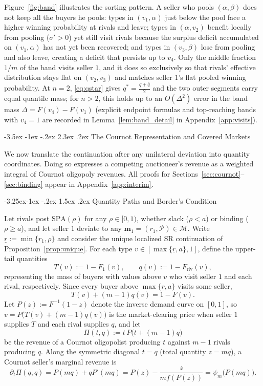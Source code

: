 \documentclass[12pt]{article}
\makeatletter
\theoremstyle{mystyle}
\theoremstyle{mystyle2}
\newcommand{\mmpfont}{\scshape}
\renewcommand\section{\@startsection {section}{1}{\z@}%
                                   {-3.5ex \@plus -1ex \@minus -.2ex}%
                                   {2.3ex \@plus .2ex}%
                                   {\normalfont\large\mmpfont}}
\renewcommand\subsection{\@startsection{subsection}{2}{\z@}%
                                     {-3.25ex\@plus -1ex \@minus -.2ex}%
                                     {1.5ex \@plus .2ex}%
                                     {\normalfont\normalsize\mmpfont}}
\newcommand{\M}{\mathcal{M}}
\newcommand{\cP}{\mathcal{P}}
\newcommand{\bmm}{\mathbf{m}}
\newcommand{\SPA}{\mathrm{SPA}}
\newcommand{\1}{\mathbf{1}}
\makeatother
\begin{document}
Figure~\ref{fig:band} illustrates the sorting pattern. A seller who pools $(\alpha,\beta)$ does not keep all the buyers he pools: types in $(v_1,\alpha)$ just below the pool face a higher winning probability at rivals and leave; types in $(\alpha,v_2)$ benefit locally from pooling ($\sigma'>0$) yet still visit rivals because the surplus deficit accumulated on $(v_1,\alpha)$ has not yet been recovered; and types in $(v_3,\beta)$ lose from pooling and also leave, creating a deficit that persists up to $v_4$. Only the middle fraction $1/m$ of the band visits seller $1$, and it does so exclusively so that rivals' effective distribution stays flat on $(v_2,v_3)$ and matches seller $1$'s flat pooled winning probability. At $n=2$, \eqref{eq:qstar} gives $q^*=\frac{\underline q+\bar q}{2}$ and the two outer segments carry equal quantile mass; for $n>2$, this holds up to an $O(\Delta^2)$ error in the band mass $\Delta=F(v_4)-F(v_1)$ (explicit endpoint formulas and top-reaching bands with $v_4=1$ are recorded in Lemma~\ref{lem:band_detail} in Appendix~\ref{app:visits}).

\section{The Cournot Representation and Covered Markets} \label{sec:cournot}

We now translate the continuation after any unilateral deviation into quantity coordinates. Doing so expresses a competing auctioneer's revenue as a weighted integral of Cournot oligopoly revenues. All proofs for Sections~\ref{sec:cournot}--\ref{sec:binding} appear in Appendix~\ref{app:interim}.

\subsection{Quantity Paths and Border's Condition}

Let rivals post $\SPA(\rho)$ for any $\rho\in[0,1)$, whether slack ($\rho<a$) or binding ($\rho\ge a$), and let seller $1$ deviate to any $\bmm_1=(r_1,\cP)\in\M$. Write $\underline r:=\min\{r_1,\rho\}$ and consider the unique localized SR continuation of Proposition~\ref{prop:unique}. For each type $v\in[\max\{\underline r,a\},1]$, define the upper-tail quantities
\[
T(v) := 1 - F_1(v), \qquad q(v) := 1 - F_{\mathrm{riv}}(v),
\]
representing the mass of buyers with values above $v$ who visit seller $1$ and each rival, respectively. Since every buyer above $\max\{\underline r,a\}$ visits some seller,
\[
T(v) + (m-1)q(v) = 1 - F(v).
\]
Let $P(z):=F^{-1}(1-z)$ denote the inverse demand curve on $[0,1]$, so $v=P\bigl(T(v)+(m-1)q(v)\bigr)$ is the market-clearing price when seller $1$ supplies $T$ and each rival supplies $q$, and let
\[
\Pi(t,q) := t\,P\bigl(t + (m-1)q\bigr)
\]
be the revenue of a Cournot oligopolist producing $t$ against $m-1$ rivals producing $q$. Along the symmetric diagonal $t=q$ (total quantity $z=mq$), a Cournot seller's marginal revenue is
\[
\partial_t \Pi(q,q) = P(mq) + q P'(mq) = P(z) - \frac{z}{m f(P(z))} = \psi_m\bigl(P(mq)\bigr).
\]
\end{document}
